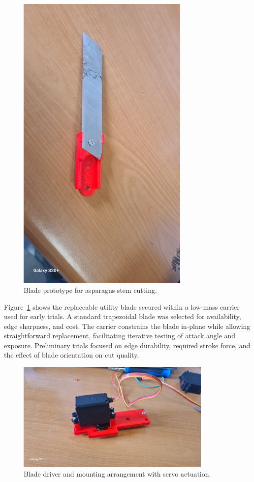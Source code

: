\begin{figure}[H]
\centering
\includegraphics[width=0.75\textwidth]{Blade.jpg}
\caption{Blade prototype for asparagus stem cutting.}
\label{fig:blade}
\end{figure}

Figure~\ref{fig:blade} shows the replaceable utility blade secured within a low-mass carrier used
for early trials. A standard trapezoidal blade was selected for availability, edge sharpness, and
cost. The carrier constrains the blade in-plane while allowing straightforward replacement,
facilitating iterative testing of attack angle and exposure. Preliminary trials focused on edge
durability, required stroke force, and the effect of blade orientation on cut quality.

\begin{figure}[H]
\centering
\includegraphics[width=0.85\textwidth]{bladeDriverandMount.jpg}
\caption{Blade driver and mounting arrangement with servo actuation.}
\label{fig:blade_driver_mount}
\end{figure}

